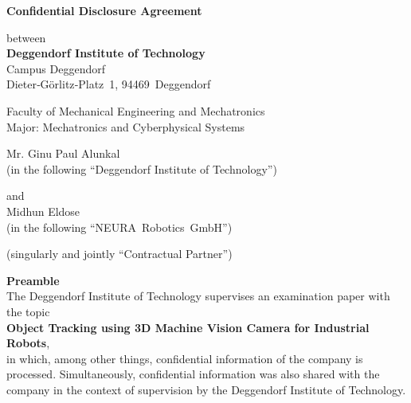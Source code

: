 \documentclass[12pt]{article}
\begin{document}
\begin{titlepage}
  \centering
  \textbf{Confidential Disclosure Agreement}\\[0.5em]
  {\normalfont\fontsize{14}{16}\selectfont}
  
  \vspace{1cm}
  
  between\\[0.5em]
  \textbf{Deggendorf Institute of Technology}\\[0.2em]
  Campus Deggendorf\\
  Dieter‑Görlitz‑Platz 1, 94469 Deggendorf
  
   \vspace{0.5cm}
  
  Faculty of Mechanical Engineering and Mechatronics\\[0.2em]
  Major: Mechatronics and Cyberphysical Systems
  
   \vspace{0.5cm}
  
  Mr. Ginu Paul Alunkal\\[0.5em]
  (in the following “Deggendorf Institute of Technology”)
  
   \vspace{0.5cm}
  
  and\\[0.5em]
  Midhun Eldose\\[0.5em]
  (in the following “NEURA Robotics GmbH”)
  
   \vspace{0.5cm}
  
  (singularly and jointly “Contractual Partner”)
  
  \vspace{2cm}
  
  \textbf{Preamble}\\[0.5em]
  The Deggendorf Institute of Technology supervises an examination paper with the topic\\
   \vspace{0.5cm}
  \textbf{Object Tracking using 3D Machine Vision Camera for Industrial Robots},
    \vspace{0.5cm}
  \\in which,
  among other things, confidential information of the company is processed. Simultaneously,
  confidential information was also shared with the company in the context of supervision
  by the Deggendorf Institute of Technology.
\end{titlepage}
\end{document}
